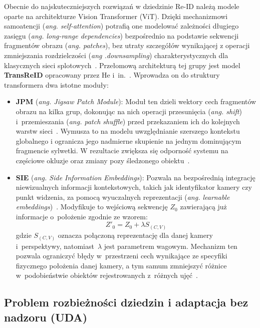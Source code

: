 Obecnie do najskuteczniejszych rozwiązań w dziedzinie Re-ID należą modele oparte na architekturze
Vision Transformer (ViT). Dzięki mechanizmowi samoatencji (\textit{ang. self-attention}) potrafią
one modelować zależności długiego zasięgu (\textit{ang. long-range dependencies}) bezpośrednio na
podstawie sekwencji fragmentów obrazu (\textit{ang. patches}), bez utraty szczegółów wynikającej z
operacji zmniejszania rozdzielczości (\textit{ang .downsampling}) charakterystycznych dla
klasycznych sieci splotowych~\cite{he2021transreid}. Przełomową architekturą tej grupy jest model
\textbf{TransReID} opracowany przez He i~in.~\cite{he2021transreid}. Wprowadza on do struktury
transformera dwa istotne moduły:
\begin{itemize}
  \item \textbf{JPM} (\textit{ang. Jigsaw Patch Module}): Moduł ten dzieli wektory cech fragmentów obrazu na kilka grup, dokonując na nich operacji przesunięcia (\textit{ang. shift}) i~przemieszania (\textit{ang. patch shuffle}) przed przekazaniem ich do kolejnych warstw sieci~\cite{he2021transreid}. Wymusza to na modelu uwzględnianie szerszego kontekstu globalnego i ogranicza jego nadmierne skupienie na jednym dominującym fragmencie sylwetki. W rezultacie zwiększa się odporność systemu na częściowe okluzje oraz zmiany pozy śledzonego obiektu~\cite{he2021transreid}.
  \item \textbf{SIE} (\textit{ang. Side Information Embeddings}): Pozwala na bezpośrednią integrację niewizualnych informacji kontekstowych, takich jak identyfikator kamery czy punkt widzenia, za pomocą wyuczalnych reprezentacji (\textit{ang. learnable embeddings})~\cite{he2021transreid}. Modyfikuje to wejściową sekwencję $Z_0$ zawierającą już informacje o~położenie zgodnie ze wzorem:
        \begin{equation}
          Z'_0 = Z_0 + \lambda S_{(C,V)}
          \label{eq:sie}
        \end{equation}
        gdzie $S_{(C,V)}$ oznacza połączoną reprezentację dla danej kamery i~perspektywy, natomiast~$\lambda$ jest parametrem wagowym. Mechanizm ten pozwala ograniczyć błędy w~przestrzeni cech wynikające ze specyfiki fizycznego położenia danej kamery, a tym samum zmniejszyć różnice w~podobieństwie obiektów rejestrowanych z~różnych ujęć~\cite{he2021transreid}.
\end{itemize}

\subsection{Problem rozbieżności dziedzin i adaptacja bez nadzoru (UDA)}
\label{subsec:domain_gap_reid}


